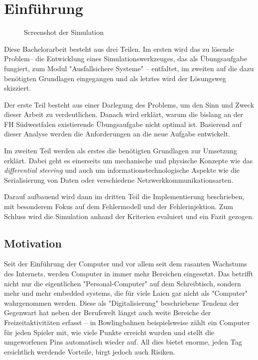 \clearpage
\section{Einf{\"{u}}hrung}
\begin{figure}
	\centering
	\caption{Screenshot der Simulation}
	\label{fig:simulation}
\end{figure}

Diese Bachelorarbeit besteht aus drei Teilen. Im ersten wird das zu l{\"{o}}sende Problem-- die Entwicklung eines
Simulationswerkzeuges, das als {\"{U}}bungsaufgabe fungiert, zum Modul "Ausfallsichere Systeme" -- entfaltet,
im zweiten auf die dazu ben{\"{o}}tigten Grundlagen eingegangen und als letztes wird der L{\"{o}}sungsweg 
skizziert. 

Der erste Teil besteht aus einer Darlegung des Problems, um den Sinn und Zweck dieser Arbeit zu verdeutlichen. 
Danach wird erkl{\"{a}}rt, warum die bislang an der FH S{\"{u}}dwestfalen existierende {\"{U}}bungsaufgabe nicht optimal ist.
Basierend auf dieser Analyse werden die Anforderungen an die neue Aufgabe entwickelt. 

Im zweiten Teil werden als erstes die ben{\"{o}}tigten Grundlagen zur Umsetzung erkl{\"{a}}rt. Dabei geht es einerseits um 
mechanische und physische Konzepte wie das \textit{differential steering} und auch um informationstechnologische Aspekte
wie die Serialisierung von Daten oder verschiedene Netzwerkkommunikationsarten.

Darauf aufbauend wird dann im dritten Teil die Implementierung beschrieben, mit besonderem Fokus auf dem 
Fehlermodell und der Fehlerinjektion. Zum Schluss wird die Simulation anhand der Kriterien evaluiert und ein Fazit 
gezogen.

\subsection{Motivation}
Seit der Einf{\"{u}}hrung der Computer und vor allem seit dem rasanten Wachstums des Internets, werden Computer in immer 
mehr Bereichen eingesetzt. Das betrifft nicht nur die eigentlichen "Personal-Computer" auf dem Schreibtisch, 
sondern mehr und mehr embedded systems, die f{\"{u}}r viele Laien gar nicht als "Computer" wahrgenommen werden. Diese 
als "Digitalisierung" beschriebene Tendenz der Gegenwart hat neben der Berufswelt l{\"{a}}ngst auch weite Bereiche 
der Freizeitaktivit{\"{a}}ten erfasst -- in Bowlingbahnen beispielsweise z{\"{a}}hlt ein Computer f{\"{u}}r jeden 
Spieler mit, wie viele Punkte erreicht wurden und stellt die umgeworfenen Pins automatisch wieder auf. All dies 
bietet enorme, jeden Tag ersichtlich werdende Vorteile, birgt jedoch auch Risiken. 

